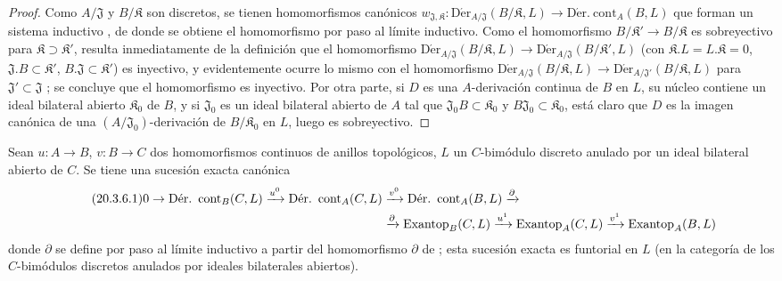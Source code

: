 \begin{proof}
Como $A/\mathfrak{J}$ y $B/\mathfrak{K}$ son discretos, se tienen
homomorfismos canónicos
$w_{\mathfrak{J},\mathfrak{K}}:
\operatorname{D\acute{e}r}_{A/\mathfrak{J}}(B/\mathfrak{K},L)\to
\operatorname{D\acute{e}r.\ cont}_A(B,L)$ que forman un sistema inductivo
, de donde se obtiene el homomorfismo  por paso al
límite inductivo. Como el homomorfismo
$B/\mathfrak{K}'\to B/\mathfrak{K}$ es sobreyectivo para
$\mathfrak{K}\supset\mathfrak{K}'$, resulta inmediatamente de la definición que
el homomorfismo
$\operatorname{D\acute{e}r}_{A/\mathfrak{J}}(B/\mathfrak{K},L)\to
\operatorname{D\acute{e}r}_{A/\mathfrak{J}}(B/\mathfrak{K}',L)$ (con
$\mathfrak{K}.L=L.\mathfrak{K}=0$,
$\mathfrak{J}.B\subset\mathfrak{K}'$,
$B.\mathfrak{J}\subset\mathfrak{K}'$) es inyectivo, y evidentemente ocurre
lo mismo con el homomorfismo
$\operatorname{D\acute{e}r}_{A/\mathfrak{J}}(B/\mathfrak{K},L)\to
\operatorname{D\acute{e}r}_{A/\mathfrak{J}'}(B/\mathfrak{K},L)$ para
$\mathfrak{J}'\subset\mathfrak{J}$ ; se concluye que
el homomorfismo  es inyectivo. Por otra parte, si $D$ es
una $A$-derivación continua de $B$ en $L$, su núcleo contiene un ideal
bilateral abierto $\mathfrak{K}_0$ de $B$, y si $\mathfrak{J}_0$ es un ideal
bilateral abierto de $A$ tal que $\mathfrak{J}_0B\subset\mathfrak{K}_0$ y
$B\mathfrak{J}_0\subset\mathfrak{K}_0$, está claro que $D$ es la imagen
canónica de una $(A/\mathfrak{J}_0)$-derivación de
$B/\mathfrak{K}_0$ en $L$, luego  es sobreyectivo.
\end{proof}

\begin{proposition}[20.3.6]
\label{0.20.3.6-fr}
Sean $u:A\to B$, $v:B\to C$ dos homomorfismos continuos de anillos
topológicos, $L$ un $C$-bimódulo discreto anulado por un ideal bilateral abierto
de $C$. Se tiene una sucesión exacta canónica
\begin{align}
\tag{20.3.6.1}
\label{0.20.3.6.1-fr}
  0\to\operatorname{D\acute{e}r.\ cont}_B(C,L)\xrightarrow{u^0}
  \operatorname{D\acute{e}r.\ cont}_A(C,L)&\xrightarrow{v^0}
  \operatorname{D\acute{e}r.\ cont}_A(B,L)\xrightarrow{\partial} \\
  &\xrightarrow{\partial}\operatorname{Exantop}_B(C,L)\xrightarrow{u^1}
  \operatorname{Exantop}_A(C,L)\xrightarrow{v^1}
  \operatorname{Exantop}_A(B,L) \notag
\end{align}
donde $\partial$ se define por paso al límite inductivo a partir del
homomorfismo $\partial$ de ; esta sucesión exacta es
funtorial en $L$ (en la categoría de los $C$-bimódulos discretos anulados por
ideales bilaterales abiertos).
\end{proposition}


